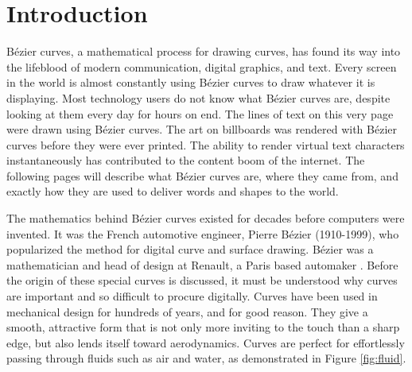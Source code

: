 \documentclass[12pt,letterpaper]{article}
\begin{document}
\section{Introduction}
B\'ezier curves, a mathematical process for drawing curves, has found its way into the lifeblood of modern communication, digital graphics, and text. Every screen in the world is almost constantly using B\'ezier curves to draw whatever it is displaying. Most technology users do not know what B\'ezier curves are, despite looking at them every day for hours on end.  The lines of text on this very page were drawn using B\'ezier curves. The art on billboards was rendered with B\'ezier curves before they were ever printed. The ability to render virtual text characters instantaneously has contributed to the content boom of the internet. The following pages will describe what B\'ezier curves are, where they came from, and exactly how they are used to deliver words and shapes to the world.

The mathematics behind B\'ezier curves existed for decades before computers were invented. It was the French automotive engineer, Pierre B\'ezier (1910-1999), who popularized the method for digital curve and surface drawing. B\'ezier was a mathematician and head of design at Renault, a Paris based automaker \citep{handbook}. Before the origin of these special curves is discussed, it must be understood why curves are important and so difficult to procure digitally.
Curves have been used in mechanical design for hundreds of years, and for good reason. They give a smooth, attractive form that is not only more inviting to the touch than a sharp edge, but also lends itself toward aerodynamics. Curves are perfect for effortlessly passing through fluids such as air and water, as demonstrated in Figure \ref{fig:fluid}.
\end{document}
